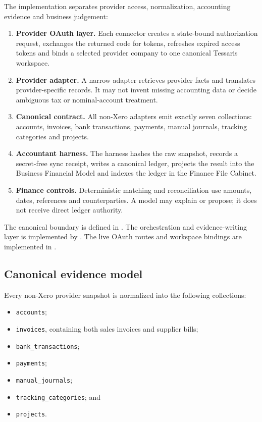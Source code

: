 The implementation separates provider access, normalization, accounting
evidence and business judgement:

\begin{enumerate}[leftmargin=*]
  \item \textbf{Provider OAuth layer.}  Each connector creates a state-bound
        authorization request, exchanges the returned code for tokens, refreshes
        expired access tokens and binds a selected provider company to one
        canonical Tessaris workspace.
  \item \textbf{Provider adapter.}  A narrow adapter retrieves provider facts
        and translates provider-specific records.  It may not invent missing
        accounting data or decide ambiguous tax or nominal-account treatment.
  \item \textbf{Canonical contract.}  All non-Xero adapters emit exactly seven
        collections: accounts, invoices, bank transactions, payments, manual
        journals, tracking categories and projects.
  \item \textbf{Accountant harness.}  The harness hashes the raw snapshot,
        records a secret-free sync receipt, writes a canonical ledger, projects
        the result into the Business Financial Model and indexes the ledger in
        the Finance File Cabinet.
  \item \textbf{Finance controls.}  Deterministic matching and reconciliation
        use amounts, dates, references and counterparties.  A model may explain
        or propose; it does not receive direct ledger authority.
\end{enumerate}

The canonical boundary is defined in
.
The orchestration and evidence-writing layer is implemented by
.
The live OAuth routes and workspace bindings are implemented in
.

\subsection{Canonical evidence model}

Every non-Xero provider snapshot is normalized into the following collections:

\begin{itemize}[leftmargin=*]
  \item \texttt{accounts};
  \item \texttt{invoices}, containing both sales invoices and supplier bills;
  \item \texttt{bank\_transactions};
  \item \texttt{payments};
  \item \texttt{manual\_journals};
  \item \texttt{tracking\_categories}; and
  \item \texttt{projects}.
\end{itemize}

